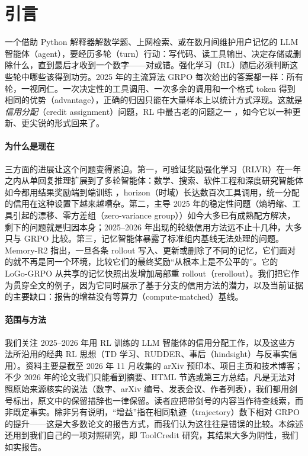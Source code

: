 \section{引言}\label{sec:intro}

一个借助 Python 解释器解数学题、上网检索、或在数月间维护用户记忆的 LLM 智能体（agent），要经历多轮（turn）行动：写代码、读工具输出、决定存储或删除什么，直到最后才收到一个数字——对或错。强化学习（RL）随后必须判断这些轮中哪些该得到功劳。2025 年的主流算法 GRPO \citep{shao2024deepseekmath} 每次给出的答案都一样：所有轮，一视同仁。一次决定性的工具调用、一次多余的调用和一个格式 token 得到相同的优势（advantage），正确的归因只能在大量样本上以统计方式浮现。这就是\emph{信用分配}（credit assignment）问题，RL 中最古老的问题之一 \citep{sutton1988learning,pignatelli2024survey}，如今它以一种更新、更尖锐的形式回来了。

\paragraph{为什么是现在}
三方面的进展让这个问题变得紧迫。第一，可验证奖励强化学习（RLVR）在一年之内从单回复推理扩展到了多轮智能体：数学、搜索、软件工程和深度研究智能体如今都用结果奖励端到端训练 \citep{zhang2025landscape}，horizon（时域）长达数百次工具调用，统一分配的信用在这种设置下越来越嘈杂。第二，主导 2025 年的稳定性问题（熵坍缩、工具引起的漂移、零方差组（zero-variance group））如今大多已有成熟配方解决，剩下的问题就是归因本身；2025--2026 年出现的轮级信用方法远不止十几种，大多只与 GRPO 比较。第三，记忆智能体暴露了标准组内基线无法处理的问题。Memory-R2 \citep{yan2026memory} 指出，一旦各条 rollout 写入、更新或删除了不同的记忆，它们面对的就不再是同一个环境，比较它们的最终奖励“从根本上是不公平的”\unverified。它的 LoGo-GRPO 从共享的记忆快照出发增加局部重 rollout（rerollout）。我们把它作为贯穿全文的例子，因为它同时展示了基于分支的信用方法的潜力，以及当前证据的主要缺口：报告的增益没有等算力（compute-matched）基线。

\paragraph{范围与方法}
我们关注 2025--2026 年用 RL 训练的 LLM 智能体的信用分配工作，以及这些方法所沿用的经典 RL 思想（TD 学习、RUDDER、事后（hindsight）与反事实信用）。资料主要是截至 2026 年 11 月收集的 arXiv 预印本、项目主页和技术博客；不少 2026 年的论文我们只能看到摘要、HTML 节选或第三方总结。凡是无法对照原始来源核实的说法（数字、arXiv 编号、发表会议、作者列表），我们都用剑号\unverified{}标出，原文中的保留措辞也一律保留。读者应把带剑号的内容当作待查线索，而非既定事实。除非另有说明，“增益”指在相同轨迹（trajectory）数下相对 GRPO 的提升——这是大多数论文的报告方式，而我们认为这往往是错误的比较。本综述还用到我们自己的一项对照研究，即 ToolCredit 研究，其结果大多为阴性，我们如实报告。

